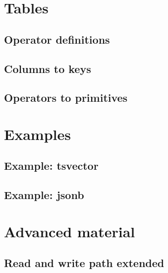 \documentclass[11pt]{article}
\begin{document}
\newpage
\hypertarget{tables}{%
\section{Tables}\label{tables}}

\hypertarget{operator-definitions}{%
\subsection{Operator definitions}\label{operator-definitions}}


\hypertarget{columns-to-keys}{%
\subsection{Columns to keys}\label{columns-to-keys}}


\hypertarget{operators-to-primitives}{%
\subsection{Operators to primitives}\label{operators-to-primitives}}


\newpage
\hypertarget{examples}{%
\section{Examples}\label{examples}}

\hypertarget{example-tsvector}{%
\subsection{Example: tsvector}\label{example-tsvector}}


\hypertarget{example-jsonb}{%
\subsection{Example: jsonb}\label{example-jsonb}}


\newpage
\hypertarget{advanced-material}{%
\section{Advanced material}\label{advanced-material}}


\hypertarget{read-and-write-path-extended}{%
\subsection{Read and write path extended}\label{read-and-write-path-extended}}
\end{document}
